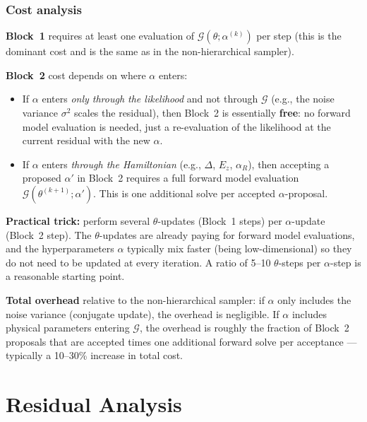 \documentclass[11pt]{article}
\newcommand{\cG}{\mathcal{G}}
\theoremstyle{plain}
\theoremstyle{remark}
\theoremstyle{definition}
\begin{document}
\subsubsection{Cost analysis}

\textbf{Block~1} requires at least one evaluation of 
$\cG(\theta; \alpha^{(k)})$ per step (this is the dominant cost and is 
the same as in the non-hierarchical sampler).

\textbf{Block~2} cost depends on where $\alpha$ enters:
\begin{itemize}
\item If $\alpha$ enters \emph{only through the likelihood} and not 
  through $\cG$ (e.g., the noise variance $\sigma^2$ scales the 
  residual), then Block~2 is essentially \textbf{free}: no forward model 
  evaluation is needed, just a re-evaluation of the likelihood at the 
  current residual with the new $\alpha$.
\item If $\alpha$ enters \emph{through the Hamiltonian} (e.g., $\Delta$, 
  $E_z$, $\alpha_R$), then accepting a proposed $\alpha'$ in Block~2 
  requires a full forward model evaluation $\cG(\theta^{(k+1)}; \alpha')$. 
  This is one additional solve per accepted $\alpha$-proposal.
\end{itemize}

\textbf{Practical trick:} perform several $\theta$-updates (Block~1 
steps) per $\alpha$-update (Block~2 step). The $\theta$-updates are 
already paying for forward model evaluations, and the hyperparameters 
$\alpha$ typically mix faster (being low-dimensional) so they do not 
need to be updated at every iteration. A ratio of 5--10 $\theta$-steps 
per $\alpha$-step is a reasonable starting point.

\textbf{Total overhead} relative to the non-hierarchical sampler: if 
$\alpha$ only includes the noise variance (conjugate update), the 
overhead is negligible. If $\alpha$ includes physical parameters entering 
$\cG$, the overhead is roughly the fraction of Block~2 proposals that are 
accepted times one additional forward solve per acceptance --- typically 
a 10--30\% increase in total cost.


\section{Residual Analysis}\label{sec:residuals}
\end{document}

